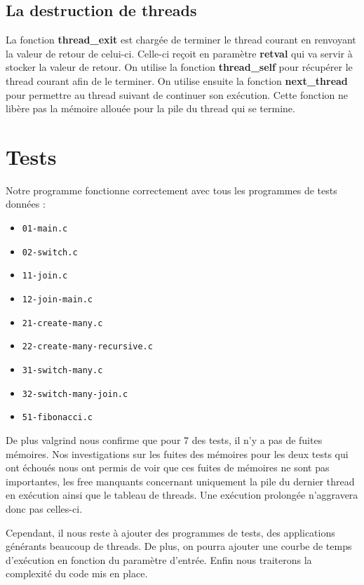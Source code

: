 \documentclass{article}
\begin{document}
\subsection{La destruction de threads}
La fonction \textbf{thread\_exit} est chargée de terminer le thread courant en
renvoyant la valeur de retour de celui-ci.
Celle-ci reçoit en paramètre \textbf{retval} qui va servir à stocker la valeur
de retour. On utilise la fonction \textbf{thread\_self} pour récupérer le
thread courant afin de le terminer.
On utilise ensuite la fonction \textbf{next\_thread} pour permettre au thread
suivant de continuer son exécution.
Cette fonction ne libère pas la mémoire allouée pour la pile du thread qui se
termine.

\section{Tests}

Notre programme fonctionne correctement avec tous les programmes de tests
données : 
\begin{itemize}
\item \verb!01-main.c!
\item \verb!02-switch.c!	
\item \verb!11-join.c!	
\item \verb!12-join-main.c!	
\item \verb!21-create-many.c!	
\item \verb!22-create-many-recursive.c!	
\item \verb!31-switch-many.c!	
\item \verb!32-switch-many-join.c!	
\item \verb!51-fibonacci.c!	
\end{itemize}
De plus valgrind nous confirme que pour 7 des tests, il n'y a pas de fuites
mémoires. Nos investigations sur les fuites des mémoires pour les deux tests qui
ont échoués nous ont permis de voir que ces fuites de mémoires ne sont pas
importantes, les free manquants concernant uniquement la pile du dernier thread en
exécution ainsi que le tableau de threads. Une exécution prolongée n'aggravera donc
pas celles-ci.

Cependant, il nous reste à ajouter des programmes de tests, des applications
générants beaucoup de threads. De plus, on pourra ajouter une courbe de temps
d'exécution en fonction du paramètre d'entrée.
Enfin nous traiterons la complexité du code mis en place.
\end{document}
